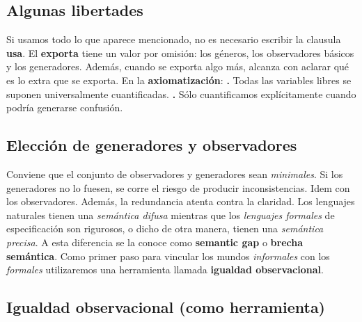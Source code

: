 \documentclass[10pt,a4paper]{article}
\begin{document}
\subsection{Algunas libertades}

Si usamos todo lo que aparece mencionado, no es necesario escribir la clausula \textbf{usa}.
\newline
\newline
El \textbf{exporta} tiene un valor por omisión: los géneros, los observadores básicos y los generadores. Además, cuando se exporta algo más, alcanza con aclarar qué es lo extra que se exporta.
\newline
\newline
En la \textbf{axiomatización}:
\newline
\newline
\textbf{.} Todas las variables libres se suponen universalmente cuantificadas.
\newline
\newline
\textbf{.} Sólo cuantificamos explícitamente cuando podría generarse confusión.

\subsection{Elección de generadores y observadores}

Conviene que el conjunto de observadores y generadores sean \textit{minimales}. 
\newline
\newline
Si los generadores no lo fuesen, se corre el riesgo de producir inconsistencias.
\newline
\newline
Idem con los observadores. Además, la redundancia atenta contra la claridad.
\newline
\newline
Los lenguajes naturales tienen una \textit{semántica difusa} mientras que los \textit{lenguajes formales} de especificación son rigurosos, o dicho de otra manera, tienen una \textit{semántica precisa}. A esta diferencia se la conoce como \textbf{semantic gap} o \textbf{brecha semántica}.
\newline
\newline
Como primer paso para vincular los mundos \textit{informales} con los \textit{formales} utilizaremos una herramienta llamada \textbf{igualdad observacional}.
\newpage

\subsection{Igualdad observacional (como herramienta)}
\end{document}
